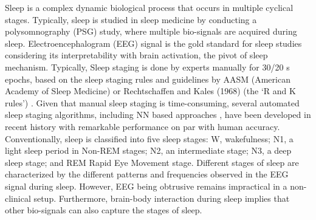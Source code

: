 \documentclass[letterpaper, 10 pt, conference]{ieeeconf}
\begin{document}
Sleep is a complex dynamic biological process that occurs in multiple cyclical stages. Typically, sleep is studied in sleep medicine by conducting a polysomnography (PSG) study, where multiple bio-signals are acquired during sleep. Electroencephalogram (EEG) signal is the gold standard for sleep studies considering its interpretability with brain activation, the pivot of sleep mechanism. Typically, Sleep staging is done by experts manually for 30/20 s epochs, based on the sleep staging rules and guidelines by AASM (American Academy of Sleep Medicine) \cite{iber2007aasm} or Rechtschaffen and Kales (1968) (the ‘R and K rules’) \cite{rechtschaffen1968manual}. Given that manual sleep staging is time-consuming, several automated sleep staging algorithms, including NN based approaches \cite{perslev2019u}, have been developed in recent history with remarkable performance on par with human accuracy. Conventionally, sleep is classified into five sleep stages:  W, wakefulness; N1, a light sleep period in Non-REM stages; N2, an intermediate stage; N3, a deep sleep stage; and REM Rapid Eye Movement stage. Different stages of sleep are characterized by the different patterns and frequencies observed in the EEG signal during sleep. However, EEG being obtrusive remains impractical in a non-clinical setup. Furthermore, brain-body interaction during sleep implies that other bio-signals can also capture the stages of sleep\cite{abdullah2009correlation}. 
\end{document}
